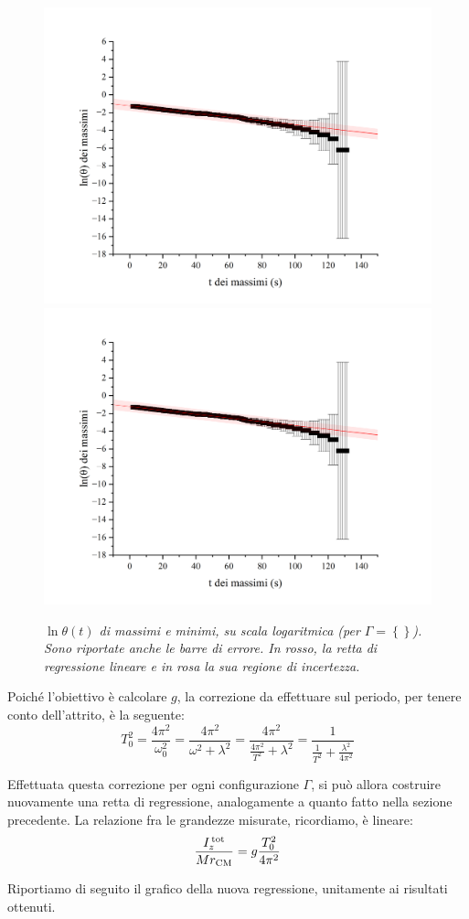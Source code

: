 \documentclass{article}
\begin{document}
\begin{center}
  \begin{figure}[H]
    \includegraphics[trim={2cm 1cm 2cm 2.1cm},clip,width=.5\textwidth]{img/0max-exp.png}
    \includegraphics[trim={2cm 1cm 2cm 2.1cm},clip,width=.5\textwidth]{img/0max-exp.png}
    \caption[]{\emph{
      $\ln{\theta(t)}$ di massimi e minimi,
      su scala logaritmica (per $\Gamma=\left\{\right\}$).
      Sono riportate anche le barre di errore.
      In rosso, la retta di regressione lineare
      e in rosa la sua regione di incertezza.
    }}
  \end{figure}
\end{center}

Poiché l'obiettivo è calcolare $g$, la correzione da effettuare
sul periodo, per tenere conto dell'attrito, è la seguente:
\[
  T_0^2 = \frac{4\pi^2}{\omega_0^2}
    = \frac{4\pi^2}{\omega^2 + \lambda^2}
    = \frac{4\pi^2}{\frac{4\pi^2}{T^2} + \lambda^2}
    = \frac{1}{\frac{1}{T^2} + \frac{\lambda^2}{4\pi^2}}
\]

Effettuata questa correzione per ogni configurazione $\Gamma$,
si può allora costruire nuovamente una retta di regressione,
analogamente a quanto fatto nella sezione precedente.
La relazione fra le grandezze misurate, ricordiamo, è lineare:
\[ \frac{I_z^\text{\,tot}}{Mr_\text{CM}} = g \frac{T_0^2}{4\pi^2} \]

Riportiamo di seguito il grafico della nuova regressione,
unitamente ai risultati ottenuti.
\end{document}
